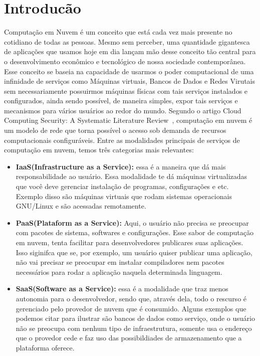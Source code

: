 \documentclass[11pt,twoside]{article}
\begin{document}
\section{Introducão}

Computação em Nuvem é um conceito que está cada vez mais presente no cotidiano de todas as pessoas. Mesmo sem perceber, uma quantidade gigantesca de aplicações que usamos hoje 
em dia lançam mão desse conceito tão central para o desenvolvimento econômico e tecnológico de nossa sociedade contemporânea. Esse conceito se baseia na capacidade de usarmos o
poder computacional de uma infinidade de serviços como Máquinas virtuais, Bancos de Dados e Redes Virutais sem necessariamente possuirmos máquinas físicas com tais serviços 
instalados e configurados, ainda sendo possível, de maneira simples, expor tais serviços e mecanismos para vários usuários ao redor do mundo. Segundo o artigo Cloud Computing Security: A
Systematic Literature Review~\cite{UPP}, computação em nuvem é um modelo de rede que torna possível o acesso sob demanda de recursos computacionais configuráveis.
Entre as modalidades principais de serviços de computação em nuvem, temos três categorias mais relevantes:

\begin{itemize}

  \item \textbf{IaaS(Infrastructure as a Service):} essa é a maneira que dá mais responsabilidade ao usuário. Essa modalidade te dá máquinas virtualizadas que você deve gerenciar 
  instalação de programas, configurações e etc. Exemplo disso são máquinas virtuais que rodam sistemas operacionais GNU/Linux e são acessadas remotamente.
  \item \textbf{PaaS(Plataform as a Service):} Aqui, o usuário não precisa se preocupar com pacotes de sistema, softwares e configurações. Esse sabor de computação em nuvem, tenta 
  facilitar para desenvolvedores publicares suas aplicações. Isso siginifca que se, por exemplo, um usuário quiser publicar uma aplicação, não vai precisar se preocupar em
  instalar compiladores nem pacotes necessários para rodar a aplicação naquela determinada linguagem.
  \item \textbf{SaaS(Software as a Service):} essa é a modalidade que traz menos autonomia para o desenvolvedor, sendo que, através dela, todo o rescurso é gerenciado pelo provedor de 
  nuvem que é consumido. Alguns exemplos que podemos citar para ilustrar são bancos de dados como serviço, onde o usuário não se preocupa com nenhum tipo de infraestrutura, 
  somente usa o endereço que o provedor cede e faz uso das possibildiades de armazenamento que a plataforma oferece.

\end{itemize}
\end{document}
